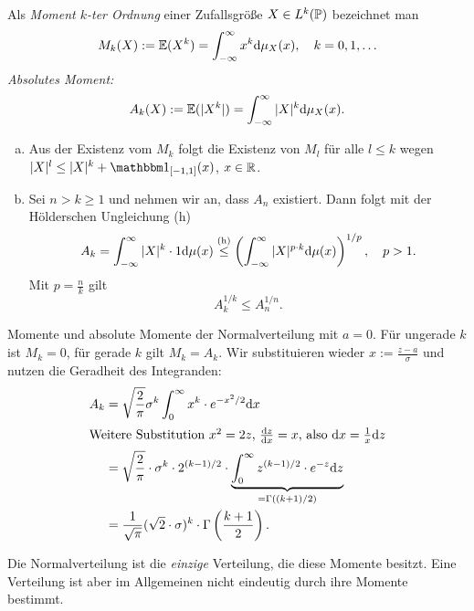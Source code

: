 \begin{defn}
  Als \emph{Moment $k$-ter Ordnung} einer Zufallsgröße $X \in L^k(\mathbb{P})$
  bezeichnet man
  \[ M_k(X) := \mathbb{E}(X^k) = \int_{-\infty}^\infty x^k \mathrm{d} \mu_X(x), \quad k =
    0, 1, \ldots \]
  \emph{Absolutes Moment:}
  \[ A_k(X) := \mathbb{E}(|X^k|) = \int_{-\infty}^\infty |X|^k \mathrm{d} \mu_X(x). \]
\end{defn}

\begin{rmrk*}
  \begin{enumerate}[(a)]
  \item Aus der Existenz vom $M_k$ folgt die Existenz von $M_l$ für alle $l \le
    k$ wegen $|X|^l \le |X|^k + \ind_{[-1,1]}(x)$, $x \in \mathbb{R}$.
  \item Sei $n > k \ge 1$ und nehmen wir an, dass $A_n$ existiert. Dann folgt
    mit der Hölderschen Ungleichung (h)
    \[ A_k = \int_{-\infty}^\infty |X|^k \cdot 1 \mathrm{d} \mu(x)
      \overset{(\text{h})}{\le}
      \left( \int_{-\infty}^\infty |X|^{p \cdot k} \mathrm{d} \mu(x)
      \right)^{1/p}, \quad p > 1. \]
    Mit $p = \frac{n}{k}$ gilt
    \[ A_k^{1/k} \le A_n^{1/n}. \]
  \end{enumerate}
\end{rmrk*}

\begin{exmp}
  Momente und absolute Momente der Normalverteilung mit $a = 0$. Für ungerade
  $k$ ist $M_k = 0$, für gerade $k$ gilt $M_k = A_k$. Wir substituieren wieder
  $x := \frac{z-a}{\sigma}$ und nutzen die Geradheit des Integranden:
  \begin{align*}
    A_k
    & = \sqrt{\frac{2}{\pi}} \sigma^k \int_0^\infty x^k \cdot e^{-x^2 / 2}
      \mathrm{d} x \\
  \intertext{Weitere Substitution $x^2 = 2z$, $\frac{\mathrm{d} z}{\mathrm{d} x} = x$, also $\mathrm{d} x
    = \frac{1}{x} \mathrm{d} z$}
    & = \sqrt{\frac{2}{\pi}} \cdot \sigma^k \cdot 2^{(k-1)/2} \cdot
      \underbrace{ \int_0^\infty z^{(k-1)/2} \cdot e^{-z} \mathrm{d} z}_{=\Gamma((k+1)/2)} \\
    & = \frac{1}{\sqrt{\pi}} (\sqrt{2} \cdot \sigma)^k \cdot \Gamma \left( \frac{k+1}{2} \right).
  \end{align*}
\end{exmp}

\begin{rmrk*}
  Die Normalverteilung ist die \emph{einzige} Verteilung, die diese Momente
  besitzt. Eine Verteilung ist aber im Allgemeinen nicht eindeutig durch ihre
  Momente bestimmt.
\end{rmrk*}

